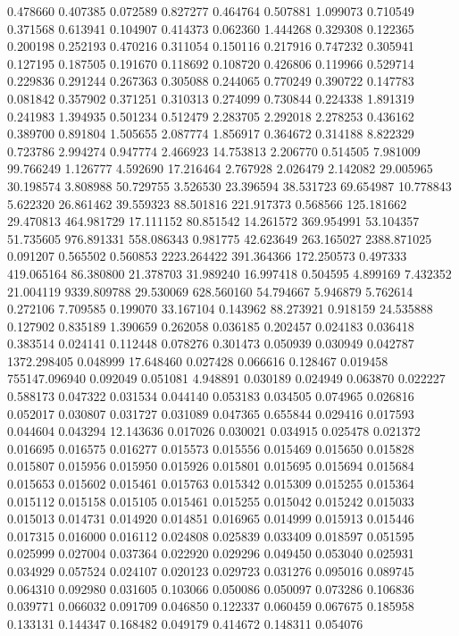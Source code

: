 0.478660
0.407385
0.072589
0.827277
0.464764
0.507881
1.099073
0.710549
0.371568
0.613941
0.104907
0.414373
0.062360
1.444268
0.329308
0.122365
0.200198
0.252193
0.470216
0.311054
0.150116
0.217916
0.747232
0.305941
0.127195
0.187505
0.191670
0.118692
0.108720
0.426806
0.119966
0.529714
0.229836
0.291244
0.267363
0.305088
0.244065
0.770249
0.390722
0.147783
0.081842
0.357902
0.371251
0.310313
0.274099
0.730844
0.224338
1.891319
0.241983
1.394935
0.501234
0.512479
2.283705
2.292018
2.278253
0.436162
0.389700
0.891804
1.505655
2.087774
1.856917
0.364672
0.314188
8.822329
0.723786
2.994274
0.947774
2.466923
14.753813
2.206770
0.514505
7.981009
99.766249
1.126777
4.592690
17.216464
2.767928
2.026479
2.142082
29.005965
30.198574
3.808988
50.729755
3.526530
23.396594
38.531723
69.654987
10.778843
5.622320
26.861462
39.559323
88.501816
221.917373
0.568566
125.181662
29.470813
464.981729
17.111152
80.851542
14.261572
369.954991
53.104357
51.735605
976.891331
558.086343
0.981775
42.623649
263.165027
2388.871025
0.091207
0.565502
0.560853
2223.264422
391.364366
172.250573
0.497333
419.065164
86.380800
21.378703
31.989240
16.997418
0.504595
4.899169
7.432352
21.004119
9339.809788
29.530069
628.560160
54.794667
5.946879
5.762614
0.272106
7.709585
0.199070
33.167104
0.143962
88.273921
0.918159
24.535888
0.127902
0.835189
1.390659
0.262058
0.036185
0.202457
0.024183
0.036418
0.383514
0.024141
0.112448
0.078276
0.301473
0.050939
0.030949
0.042787
1372.298405
0.048999
17.648460
0.027428
0.066616
0.128467
0.019458
755147.096940
0.092049
0.051081
4.948891
0.030189
0.024949
0.063870
0.022227
0.588173
0.047322
0.031534
0.044140
0.053183
0.034505
0.074965
0.026816
0.052017
0.030807
0.031727
0.031089
0.047365
0.655844
0.029416
0.017593
0.044604
0.043294
12.143636
0.017026
0.030021
0.034915
0.025478
0.021372
0.016695
0.016575
0.016277
0.015573
0.015556
0.015469
0.015650
0.015828
0.015807
0.015956
0.015950
0.015926
0.015801
0.015695
0.015694
0.015684
0.015653
0.015602
0.015461
0.015763
0.015342
0.015309
0.015255
0.015364
0.015112
0.015158
0.015105
0.015461
0.015255
0.015042
0.015242
0.015033
0.015013
0.014731
0.014920
0.014851
0.016965
0.014999
0.015913
0.015446
0.017315
0.016000
0.016112
0.024808
0.025839
0.033409
0.018597
0.051595
0.025999
0.027004
0.037364
0.022920
0.029296
0.049450
0.053040
0.025931
0.034929
0.057524
0.024107
0.020123
0.029723
0.031276
0.095016
0.089745
0.064310
0.092980
0.031605
0.103066
0.050086
0.050097
0.073286
0.106836
0.039771
0.066032
0.091709
0.046850
0.122337
0.060459
0.067675
0.185958
0.133131
0.144347
0.168482
0.049179
0.414672
0.148311
0.054076

